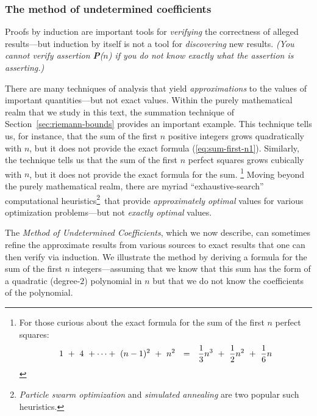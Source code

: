 \subsubsection{The method of undetermined coefficients}
\label{sec:undetermined-coefficients1}


Proofs by induction are important tools for {\em verifying} the
correctness of alleged results---but induction by itself is not a tool
for {\em discovering} new results.  {\em (You cannot {\em verify}
  assertion {\bf P}($n$) if you do not know {\em exactly} what the
  assertion is asserting.)}

There are many techniques of analysis that yield {\em approximations}
to the values of important quantities---but not exact values.  Within
the purely mathematical realm that we study in this text, the
summation technique of Section~\ref{sec:riemann-bounds} provides an
important example.  This technique tells us, for instance, that the
sum of the first $n$ positive integers grows quadratically with $n$,
but it does not provide the exact formula (\ref{eq:sum-first-n1}).
Similarly, the technique tells us that the sum of the first $n$
perfect squares grows cubically with $n$, but it does not provide the
exact formula for the sum.
\footnote{For those curious about the exact
  formula for the sum of the first $n$ perfect squares:
\begin{equation}
\label{eq:sum-1-to-nsq1}
1 \ + \ 4 \ + \cdots + \ (n-1)^2 \ + \ n^2 
 \ \ = \ \
{1 \over 3} n^3 \ + \ {1 \over 2} n^2 \ + \ {1 \over 6} n
\end{equation}}
Moving beyond the purely mathematical realm, there are myriad
``exhaustive-search'' computational heuristics\footnote{{\it Particle
    swarm optimization} \cite{KennedyE95} and {\it simulated
    annealing} \cite{KirkpatrickGV83} are two popular such
  heuristics.}~that provide {\em approximately optimal} values for various
optimization problems---but not {\em exactly optimal} values.

\medskip

The {\em Method of Undetermined Coefficients}, which we now describe,
can sometimes refine the approximate results from various sources to
exact results that one can then verify via induction.  We illustrate
the method by deriving a formula for the sum of the first $n$
integers---assuming that we know that this sum has the form of a
quadratic (degree-$2$) polynomial in $n$ but that we do not know the
coefficients of the polynomial.

